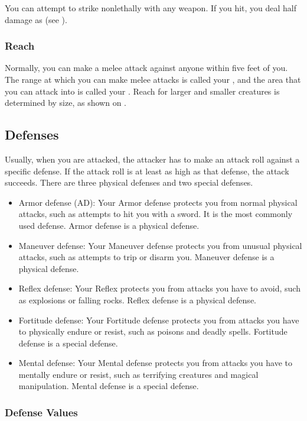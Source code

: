  You can attempt to strike nonlethally with any weapon.
If you hit, you deal half damage as  (see ).

\subsubsection{Reach}\label{Reach}
Normally, you can make a melee attack against anyone within five feet of you.
The range at which you can make melee attacks is called your , and the area that you can attack into is called your .
Reach for larger and smaller creatures is determined by size, as shown on .

\subsection{Defenses}\label{Defenses}
Usually, when you are attacked, the attacker has to make an attack roll against a specific defense.
If the attack roll is at least as high as that defense, the attack succeeds.
There are three physical defenses and two special defenses.
\begin{itemize}
    \item Armor defense (AD): Your Armor defense protects you from normal physical attacks, such as attempts to hit you with a sword.
        It is the most commonly used defense.
        Armor defense is a physical defense.
    \item Maneuver defense: Your Maneuver defense protects you from unusual physical attacks, such as attempts to trip or disarm you.
        Maneuver defense is a physical defense.
    \item Reflex defense: Your Reflex protects you from attacks you have to avoid, such as explosions or falling rocks.
        Reflex defense is a physical defense.
    \item Fortitude defense: Your Fortitude defense protects you from attacks you have to physically endure or resist, such as poisons and deadly spells.
        Fortitude defense is a special defense.
    \item Mental defense: Your Mental defense protects you from attacks you have to mentally endure or resist, such as terrifying creatures and magical manipulation.
        Mental defense is a special defense.
\end{itemize}

\subsubsection{Defense Values}

